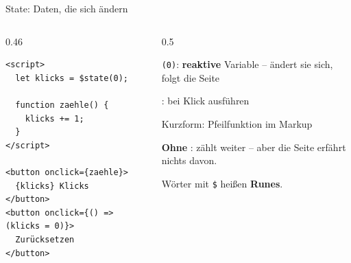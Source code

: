 \begin{frame}[fragile]{State: Daten, die sich ändern}
  \begin{columns}[onlytextwidth,t]
    \begin{column}{0.46\textwidth}
\begin{lstlisting}[style=svelte]
<script>
  let klicks = $state(0);

  function zaehle() {
    klicks += 1;
  }
</script>

<button onclick={zaehle}>
  {klicks} Klicks
</button>
<button onclick={() => (klicks = 0)}>
  Zurücksetzen
</button>
\end{lstlisting}
    \end{column}
    \begin{column}{0.5\textwidth}
      \footnotesize
      \begin{tugitemize}
        \item[2] \texttt{(0)}: \textbf{reaktive} Variable --
              ändert sie sich, folgt die Seite
        \item[9] : bei Klick ausführen
        \item[12] Kurzform: Pfeilfunktion im Markup
      \end{tugitemize}
      \vspace{0.4em}
      \textbf{Ohne} :  zählt weiter --
      aber die Seite erfährt nichts davon.

      \vspace{0.4em}
      Wörter mit \texttt{\$} heißen \textbf{Runes}.
    \end{column}
  \end{columns}
\end{frame}

